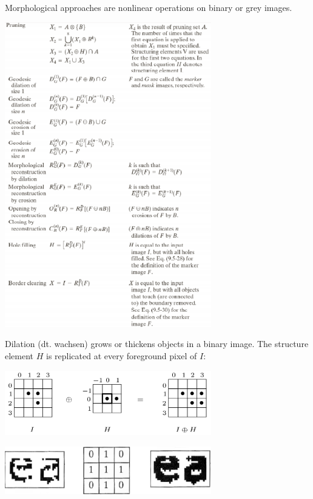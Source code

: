   \begin{minipage}{9.5cm}
    Morphological approaches are nonlinear operations on binary or grey images.
    
    \includegraphics[width=9cm]{./images/morphology_table2.png}   
  \end{minipage}

  Dilation (dt. wachsen) grows or thickens objects in a binary image. The structure element $H$
  is replicated at every foreground pixel of $I$:\\
  \begin{minipage}{9cm}
    \includegraphics[width=9cm]{./images/dilatation.png}
  \end{minipage}
  \hspace{0.5cm}
  \begin{minipage}{9cm}
    \includegraphics[width=9cm]{./images/dilatation_example.png}
  \end{minipage}
  
